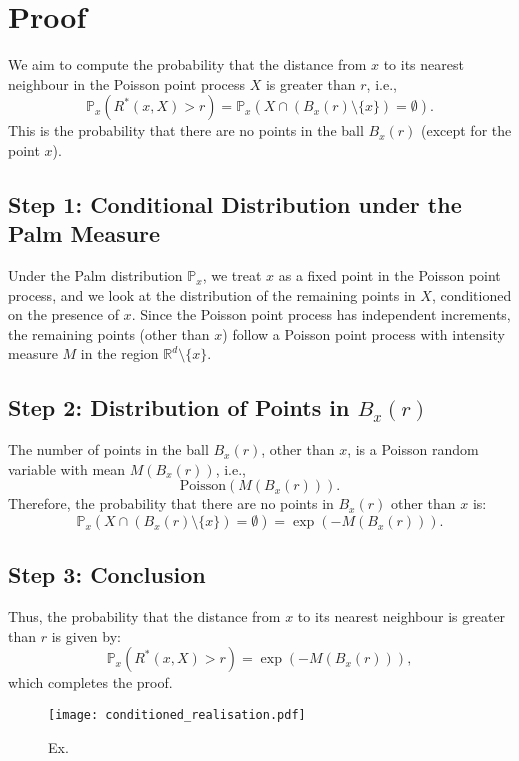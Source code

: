 \documentclass{article}
\begin{document}
\section*{Proof}
We aim to compute the probability that the distance from \( x \) to its nearest neighbour in the Poisson point process \( X \) is greater than \( r \), i.e., 
\[
\mathbb{P}_x(R^*(x, X) > r) = \mathbb{P}_x\left(X \cap (B_x(r) \setminus \{x\}) = \emptyset\right).
\]
This is the probability that there are no points in the ball \( B_x(r) \) (except for the point \( x \)).

\subsection*{Step 1: Conditional Distribution under the Palm Measure}
Under the Palm distribution \( \mathbb{P}_x \), we treat \( x \) as a fixed point in the Poisson point process, and we look at the distribution of the remaining points in \( X \), conditioned on the presence of \( x \).
Since the Poisson point process has independent increments, the remaining points (other than \( x \)) follow a Poisson point process with intensity measure \( M \) in the region \( \mathbb{R}^d \setminus \{x\} \).

\subsection*{Step 2: Distribution of Points in \( B_x(r) \)}
The number of points in the ball \( B_x(r) \), other than \( x \), is a Poisson random variable with mean \( M(B_x(r)) \), i.e.,
\[
\text{Poisson}(M(B_x(r))).
\]
Therefore, the probability that there are no points in \( B_x(r) \) other than \( x \) is:
\[
\mathbb{P}_x\left( X \cap (B_x(r) \setminus \{x\}) = \emptyset \right) = \exp\left(-M(B_x(r))\right).
\]

\subsection*{Step 3: Conclusion}
Thus, the probability that the distance from \( x \) to its nearest neighbour is greater than \( r \) is given by:
\[
\mathbb{P}_x(R^*(x, X) > r) = \exp\left(-M(B_x(r))\right),
\]
which completes the proof.
\begin{figure}[h!]
    \centering
    \texttt{[image: conditioned\_realisation.pdf]}
    \caption{Ex.}
\end{figure}
\end{document}
